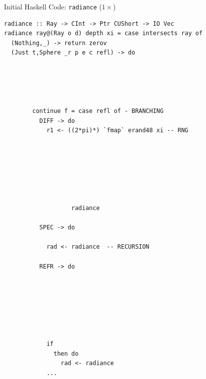 \documentclass[8pt]{beamer}
\newcommand{\raw}[1]{\texttt{#1}}
\begin{document}
\begin{frame}[fragile]{Initial Haskell Code: \texttt{radiance} ($1\times$)}
\begin{verbatim}
radiance :: Ray -> CInt -> Ptr CUShort -> IO Vec
radiance ray@(Ray o d) depth xi = case intersects ray of
  (Nothing,_) -> return zerov
  (Just t,Sphere _r p e c refl) -> do
                                        
                                   
                                                              
                         
                                
        continue f = case refl of - BRANCHING
          DIFF -> do
            r1 <- ((2*pi)*) `fmap` erand48 xi -- RNG
                                                
                               
                                
                                      
                                                                                           
                                  
                                                                                                                
                   radiance 
                                            
          SPEC -> do
                                                         
            rad <- radiance  -- RECURSION
                                            
          REFR -> do
                                                                                                     
                                                                                   
                         
                           
                                                      
                                
                                                
            if 
              then do
                rad <- radiance
            ...
\end{verbatim}

\end{frame}
\end{document}
